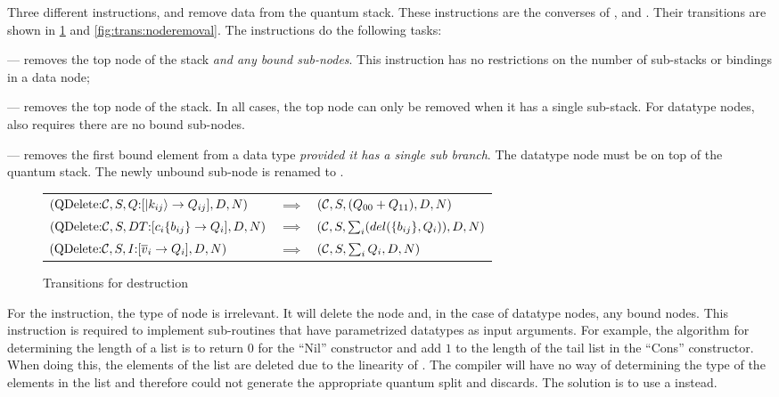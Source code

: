 Three different instructions,  and 
 remove data from the 
quantum stack.  These instructions are the converses of , 
 and . Their transitions are shown in
\ref{fig:trans:nodedestruction} and \ref{fig:trans:noderemoval}.
The instructions do the following tasks:
\begin{description}
\item{} --- removes the top node of the stack 
\emph{and any bound sub-nodes}. This instruction has no restrictions on
the number of sub-stacks or bindings in a data node;
\item{} --- removes the top node of the stack. In all cases,
the top node can only be removed when it has
a single sub-stack. For datatype nodes,  also requires
there are no bound sub-nodes.
\item{} --- removes the
 first bound element from a data type 
\emph{provided it has a single sub branch}. The datatype node must be
 on top of the quantum stack. The newly unbound sub-node is renamed
 to .
\end{description}


\begin{figure}[htbp]
\begin{tabular}{lll}
$(\mathrm{QDelete}{:}\mathcal{C},S,Q{:}[\left\vert{k_{ij}}\right\rangle\to Q_{ij}],D,N)$&$ \implies $&$(\mathcal{C},S,(Q_{00}+Q_{11}),D,N)$ \\[12pt]
$(\mathrm{QDelete}{:}\mathcal{C},S,DT{:}[c_i\{b_{ij}\} \to Q_i],D,N)$&$ \implies $&$(\mathcal{C},S,\sum_i(del(\{b_{ij}\}, Q_i)),D,N)$ \\[12pt]
$(\mathrm{QDelete}{:}\mathcal{C},S,I{:}[\overline{v}_i \to Q_i],D,N)$&$ \implies $&$(\mathcal{C},S,\sum_i Q_i,D,N)$ 
\end{tabular}
\caption{Transitions for destruction}\label{fig:trans:nodedestruction}
\end{figure}

For the  instruction, the type of node is irrelevant.
It will delete the node and, in the case of datatype nodes, any
bound nodes. This instruction is required to implement 
sub-routines that have parametrized datatypes as input arguments.
For example, the algorithm for determining the length of a
list is to return $0$ for the ``Nil'' constructor and 
add $1$ to the length of the tail list in the ``Cons'' constructor. 
When doing this, the elements of the list are deleted due to the 
linearity of \lqpl.
The compiler will have no way of determining the type of the 
elements in the list and
therefore could not generate the appropriate quantum split and discards.
The solution is to use a  instead.

